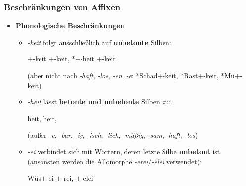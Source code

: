 \begin{frame}
\frametitle{Beschränkungen von Affixen}

\begin{itemize}
\item \textbf{Phonologische Beschränkungen}

\begin{itemize}
\item \emph{-keit} folgt ausschließlich auf \textbf{unbetonte} Silben: 				

\ea {}$+$-keit \vs *$+$-keit, *$+$-heit \vs {}$+$-keit
\z

(aber nicht nach \emph{-haft}, \emph{-los}, \emph{-en}, \emph{-e}: *Schad$+$-keit, *Rast$+$-keit, *Mü$+$-keit)

\pause 
\medskip 

\item \textit{-heit} lässt \textbf{betonte und unbetonte} Silben zu: 

\ea {}heit, heit, 
\z

(außer \emph{-e}, \emph{-bar}, \emph{-ig}, \emph{-isch}, \emph{-lich}, \emph{-mäßig}, \emph{-sam}, \emph{-haft}, \emph{-los})

\pause 
\medskip 

\item \emph{-ei} verbindet sich mit Wörtern, deren letzte Silbe \textbf{unbetont} ist (ansonsten werden die Allomorphe \emph{-erei}/\emph{-elei} verwendet): 

\ea Wüs$+$-ei \vs {}$+$-rei, $+$-elei
\z

\end{itemize}

\end{itemize}

\end{frame}


